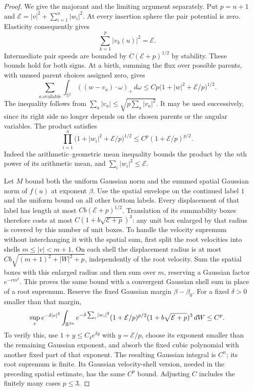 \begin{proof}
We give the majorant and the limiting argument separately. Put
$p=n+1$ and
$\mathcal E=|v|^2+\sum_{i=1}^n|w_i|^2$. At every insertion sphere the
pair potential is zero. Elasticity consequently gives
\begin{equation}\label{cent:tree-energy}
 \sum_{k=1}^p|v_k(u)|^2=\mathcal E.
\end{equation}
Intermediate pair speeds are bounded by $C(\mathcal E+p)^{1/2}$ by
stability. These bounds hold for both signs. At a birth, summing the
flux over possible parents, with unused parent choices assigned zero,
gives
\begin{equation}\label{cent:parent-sum}
 \sum_{a\ \mathrm{available}}\int_{\mathbb S^2}
       ((w-v_a)\cdot\omega)_+\,d\omega
 \leq Cp\bigl(1+|w|^2+\mathcal E/p\bigr)^{1/2}.
\end{equation}
The inequality follows from
$\sum_a|v_a|\leq\sqrt{p\sum_a|v_a|^2}$.
It may be used successively, since its right side no longer depends
on the chosen parents or the angular variables. The product satisfies
\begin{equation}\label{cent:velocity-product}
 \prod_{i=1}^n\bigl(1+|w_i|^2+\mathcal E/p\bigr)^{1/2}
 \leq C^p(1+\mathcal E/p)^{p/2}.
\end{equation}
Indeed the arithmetic--geometric mean inequality bounds the product
by the $n$th power of its arithmetic mean, and
$\sum_i|w_i|^2\leq\mathcal E$.

Let $M$ bound both the uniform Gaussian norm and the summed spatial
Gaussian norm of $f(u)$ at exponent $\beta$. Use the spatial envelope
on the continued label $1$ and the uniform bound on all other bottom
labels. Every displacement of that label has length at most
$Cb(\mathcal E+p)^{1/2}$. Translation of its summability boxes therefore
costs at most $C(1+b\sqrt{\mathcal E+p})^3$: any unit box enlarged by
that radius is covered by this number of unit boxes. To handle the velocity supremum without interchanging it with the
spatial sum, first split the root velocities into shells
$m\leq|v|<m+1$. On each shell the displacement radius is at most
$Cb\sqrt{(m+1)^2+|W|^2+p}$, independently of the root velocity.
Sum the spatial boxes with this enlarged radius and then sum over
$m$, reserving a Gaussian factor $e^{-c m^2}$. This proves the same
bound with a convergent Gaussian shell sum in place of a root
supremum. Reserve the fixed Gaussian margin $\beta-\beta_0$. For a fixed
$\delta>0$ smaller than that margin,
\begin{equation}\label{cent:moment-bound}
 \sup_v e^{-\delta|v|^2}
 \int_{\mathbb R^{3n}} e^{-\delta\sum_i|w_i|^2}
 (1+\mathcal E/p)^{p/2}(1+b\sqrt{\mathcal E+p})^3\,dW
 \leq C^p.
\end{equation}
To verify this, use
$1+y\leq C_\delta e^{\delta y}$ with $y=\mathcal E/p$,
choose its exponent smaller than the remaining Gaussian exponent,
and absorb the fixed cubic polynomial with another fixed part of
that exponent. The resulting Gaussian integral is $C^n$; its root
supremum is finite. Its Gaussian velocity-shell version, needed in
the preceding spatial estimate, has the same $C^p$ bound. Adjusting
$C$ includes the finitely many cases $p\leq3$.


\end{proof}
